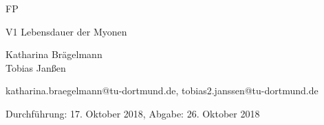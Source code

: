 \pagestyle{empty}

\begin{titlepage}



\begin{center} \large

  FP
  \vspace*{2cm}

  {\huge V1 Lebensdauer der Myonen}
  \vspace*{2.5cm}

  Katharina Brägelmann
  \\Tobias Janßen
  \vspace*{1.5cm}

  katharina.braegelmann@tu-dortmund.de, tobias2.janssen@tu-dortmund.de


  Durchführung: 17. Oktober 2018, Abgabe: 26. Oktober 2018
  \vspace*{4.5cm}


\end{center}
\end{titlepage}
